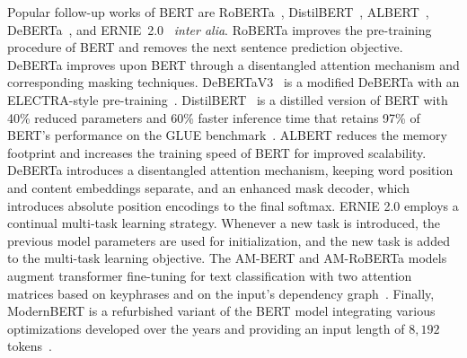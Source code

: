 \documentclass[lettersize,journal]{IEEEtran}
\begin{document}
Popular follow-up works of BERT are
RoBERTa~\cite{liu_roberta:_2019}, DistilBERT~\cite{distilbert}, ALBERT~\cite{lan_albert_2020}, DeBERTa~\cite{he_deberta_2021}, and
ERNIE~2.0~\cite{sun_ernie_2019} \emph{inter alia}.
RoBERTa improves the pre-training procedure of BERT and removes the next sentence prediction objective. DeBERTa improves upon BERT through a disentangled attention mechanism and corresponding masking techniques.
DeBERTaV3~\cite{DBLP:conf/iclr/HeGC23} is a modified DeBERTa with an ELECTRA-style pre-training~\cite{DBLP:conf/iclr/ClarkLLM20-electra}.
DistilBERT~\cite{distilbert} is a distilled version of BERT with 40\% reduced parameters and 60\% faster inference time that retains 97\% of BERT's performance on the GLUE benchmark~\cite{DBLP:conf/iclr/WangSMHLB19}.
ALBERT reduces the memory footprint and increases the training speed of BERT for improved scalability.
DeBERTa introduces a disentangled attention mechanism, \ie keeping word position and content embeddings separate, and an enhanced mask decoder, which introduces absolute position encodings to the final softmax.
ERNIE 2.0 employs a continual multi-task learning strategy. 
Whenever a new task is introduced, the previous model parameters are used for initialization, and the new task is added to the multi-task learning objective.
The AM-BERT and AM-RoBERTa models augment transformer fine-tuning for text classification with two attention matrices based on keyphrases and on the input's dependency graph~\cite{am-bert}.
Finally, ModernBERT is a refurbished variant of the BERT model integrating various optimizations developed over the years and providing an input length of $8,192$ tokens~\cite{warner2024smarterbetterfasterlonger}.
\end{document}
